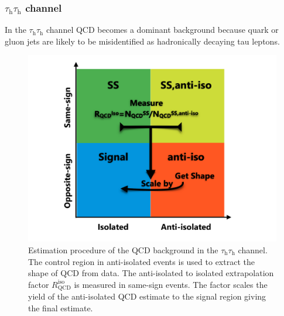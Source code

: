 \clearpage 

\subsubsection{$\tau_\text{h}\tau_\text{h}$ channel}
In the $\tau_\text{h}\tau_\text{h}$ channel QCD becomes a dominant background because quark or gluon jets are likely to be misidentified as hadronically decaying tau leptons.
\begin{figure}[h!]
    \centering
    \includegraphics[width=.5\textwidth]{Figures/background_estimation/QCD_tt/ABCD_tauhadtauhad.pdf}
    \caption{Estimation procedure of the QCD background in the $\tau_\text{h}\tau_\text{h}$ channel. The control region in anti-isolated events is used to extract the shape of QCD from data. 
    The anti-isolated to isolated extrapolation factor $R_\text{QCD}^\text{iso}$ is measured in same-sign events. The factor scales the yield of the anti-isolated QCD estimate to the signal region giving the final estimate.}\label{BE:QCD:abcd_tauhadtauhad}
\end{figure} 
 
